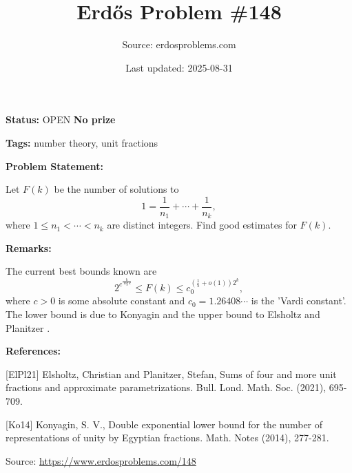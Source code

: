 \documentclass{article}
\title{Erd\H{o}s Problem \#148}
\date{Last updated: 2025-08-31}
\author{Source: erdosproblems.com}
\begin{document}
\maketitle

\noindent\textbf{Status:} OPEN \quad \textbf{No prize}

\noindent\textbf{Tags:} number theory, unit fractions

\medskip
\noindent\textbf{Problem Statement:}

Let $F(k)$ be the number of solutions to\[ 1= \frac{1}{n_1}+\cdots+\frac{1}{n_k},\]where $1\leq n_1<\cdots<n_k$ are distinct integers. Find good estimates for $F(k)$.

\bigskip
\noindent\textbf{Remarks:}

The current best bounds known are\[2^{c^{\frac{k}{\log k}}}\leq F(k) \leq c_0^{(\frac{1}{5}+o(1))2^k},\]where $c>0$ is some absolute constant and $c_0=1.26408\cdots$ is the 'Vardi constant'. The lower bound is due to Konyagin \cite{Ko14} and the upper bound to Elsholtz and Planitzer \cite{ElPl21}.

\bigskip
\noindent\textbf{References:}

[ElPl21] Elsholtz, Christian and Planitzer, Stefan, Sums of four and more unit fractions and approximate parametrizations. Bull. Lond. Math. Soc. (2021), 695-709.
 
 [Ko14] Konyagin, S. V., Double exponential lower bound for the number of representations of unity by Egyptian fractions. Math. Notes (2014), 277-281.

\bigskip
\noindent\small{Source: \url{https://www.erdosproblems.com/148}}
\end{document}
